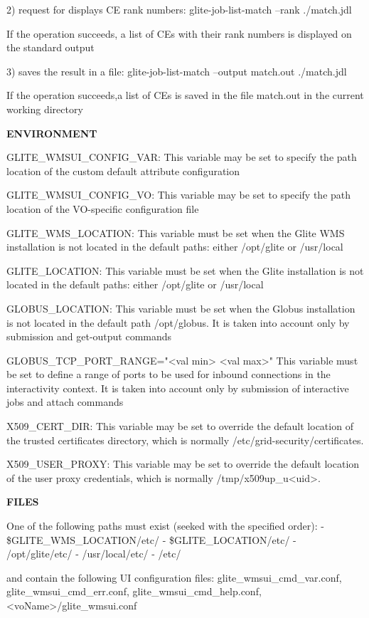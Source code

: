 {2) request for displays CE rank numbers:
glite-job-list-match --rank ./match.jdl

If the operation succeeds, a list of CEs with their rank numbers is displayed on the standard output

3) saves the result in a file:
glite-job-list-match --output match.out ./match.jdl

If the operation succeeds,a list of CEs is saved in the file match.out in the current working directory


\medskip
\textbf{ENVIRONMENT}
\smallskip


GLITE\_WMSUI\_CONFIG\_VAR:  This variable may be set to specify the path location of the custom default attribute configuration

GLITE\_WMSUI\_CONFIG\_VO: This variable may be set to specify the path location of the VO-specific configuration file

GLITE\_WMS\_LOCATION:  This variable must be set when the Glite WMS installation is not located in the default paths: either /opt/glite or /usr/local

GLITE\_LOCATION: This variable must be set when the Glite installation is not located in the default paths: either /opt/glite or /usr/local


GLOBUS\_LOCATION: This variable must be set when the Globus installation is not located in the default path /opt/globus.
It is taken into account only by submission and get-output commands

GLOBUS\_TCP\_PORT\_RANGE="<val min> <val max>" This variable must be set to define a range of ports to be used for inbound connections in the interactivity context.
It is taken into account only by submission of interactive jobs and attach commands

X509\_CERT\_DIR: This variable may be set to override the default location of the trusted certificates directory, which is normally /etc/grid-security/certificates.

X509\_USER\_PROXY: This variable may be set to override the default location of the user proxy credentials, which is normally /tmp/x509up\_u<uid>.

\medskip
\textbf{FILES}
\smallskip


One of the following paths must exist (seeked with the specified order):
- \$GLITE\_WMS\_LOCATION/etc/
- \$GLITE\_LOCATION/etc/
- /opt/glite/etc/
- /usr/local/etc/
- /etc/

and contain the following UI configuration files:
glite\_wmsui\_cmd\_var.conf, glite\_wmsui\_cmd\_err.conf, glite\_wmsui\_cmd\_help.conf, <voName>/glite\_wmsui.conf

}
